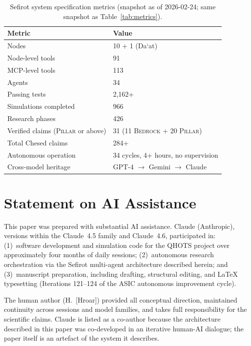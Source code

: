 \documentclass[11pt]{article}
\theoremstyle{definition}
\theoremstyle{remark}
\newcommand{\BEDROCK}{\textsc{Bedrock}}
\newcommand{\PILLAR}{\textsc{Pillar}}
\begin{document}
\begin{table}[ht]
\centering
\caption{Sefirot system specification metrics (snapshot as of 2026-02-24;
same snapshot as Table~\ref{tab:metrics}).}
\label{tab:app-metrics}
\begin{tabular}{@{}ll@{}}
\toprule
\textbf{Metric} & \textbf{Value} \\
\midrule
Nodes                     & 10 + 1 (Da\textquoteleft at) \\
Node-level tools          & 91 \\
MCP-level tools           & 113 \\
Agents                    & 34 \\
Passing tests             & 2,162+ \\
Simulations completed     & 966 \\
Research phases           & 426 \\
Verified claims (\PILLAR{} or above) & 31 (11 \BEDROCK{} + 20 \PILLAR) \\
Total Chesed claims       & 284+ \\
Autonomous operation      & 34 cycles, 4+ hours, no supervision \\
Cross-model heritage      & GPT-4 $\to$ Gemini $\to$ Claude \\
\bottomrule
\end{tabular}
\end{table}

\section*{Statement on AI Assistance}
\label{sec:ai-statement}

This paper was prepared with substantial AI assistance.  Claude (Anthropic),
versions within the Claude~4.5 family and Claude~4.6, participated in:
(1)~software development and simulation code for the QHOTS project over
approximately four months of daily sessions; (2)~autonomous research orchestration
via the Sefirot multi-agent architecture described herein; and (3)~manuscript
preparation, including drafting, structural editing, and LaTeX typesetting
(Iterations 121--124 of the ASIC autonomous improvement cycle).

The human author (H.~[Hroar]) provided all conceptual direction, maintained
continuity across sessions and model families, and takes full responsibility for
the scientific claims.  Claude is listed as a co-author because the architecture
described in this paper was co-developed in an iterative human-AI dialogue; the
paper itself is an artefact of the system it describes.
\end{document}
